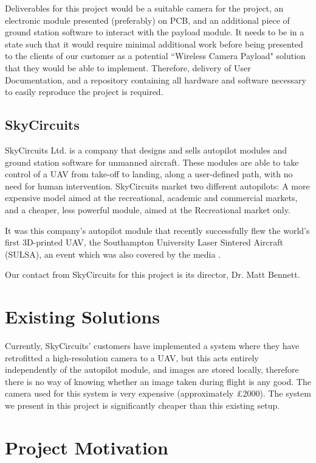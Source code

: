 Deliverables for this project would be a suitable camera for the project, an electronic module presented (preferably) on PCB, and an additional piece of ground station software to interact with the payload module. It needs to be in a state such that it would require minimal additional work before being presented to the clients of our customer as a potential ``Wireless Camera Payload" solution that they would be able to implement. Therefore, delivery of User Documentation, and a repository containing all hardware and software necessary to easily reproduce the project is required.

\subsection{SkyCircuits}

SkyCircuits Ltd. \cite{SkyCircuits} is a company that designs and sells autopilot modules and ground station software for unmanned aircraft. These modules are able to take control of a UAV from take-off to landing, along a user-defined path, with no need for human intervention. SkyCircuits market two different autopilots: A more expensive model aimed at the recreational, academic and commercial markets, and a cheaper, less powerful module, aimed at the Recreational market only.

It was this company's autopilot module that recently successfully flew the world's first 3D-printed UAV, the Southampton University Laser Sintered Aircraft (SULSA), \cite{SULSA} an event which was also covered by the media \cite{SC_Press}.

Our contact from SkyCircuits for this project is its director, Dr. Matt Bennett.

\section{Existing Solutions}
\label{sec:existing_soln}

Currently, SkyCircuits' customers have implemented a system where they have retrofitted a high-resolution camera to a UAV, but this acts entirely independently of the autopilot module, and images are stored locally, therefore there is no way of knowing whether an image taken during flight is any good. The camera used for this system is very expensive (approximately \pounds 2000). The system we present in this project is significantly cheaper than this existing setup.

\section{Project Motivation}

